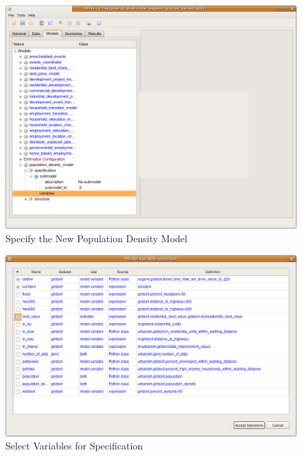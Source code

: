 \begin{figure}[htp]
\begin{center}
\includegraphics[scale=0.4]{part-gui/images/model-manager-specify-regression-model-1.png}
\end{center}
\caption{Specify the New Population Density Model}
\label{fig:specify-regression-1}
\end{figure}

\begin{figure}[htp]
\begin{center}
\includegraphics[scale=0.4]{part-gui/images/model-manager-specify-regression-model-2.png}
\end{center}
\caption{Select Variables for Specification}
\label{fig:specify-regression-2}
\end{figure}


